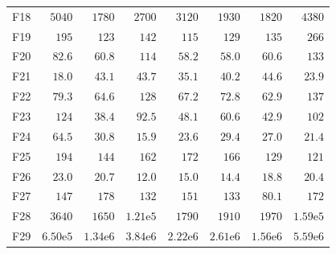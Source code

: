 \begin{tabular}{lrrrrrrr}
F18 & $5040$ & $1780$ & $2700$ & $3120$ & $1930$ & $1820$ & $4380$ \\
F19 & $195$ & $123$ & $142$ & $115$ & $129$ & $135$ & $266$ \\
F20 & $82.6$ & $60.8$ & $114$ & $58.2$ & $58.0$ & $60.6$ & $133$ \\
F21 & $18.0$ & $43.1$ & $43.7$ & $35.1$ & $40.2$ & $44.6$ & $23.9$ \\
F22 & $79.3$ & $64.6$ & $128$ & $67.2$ & $72.8$ & $62.9$ & $137$ \\
F23 & $124$ & $38.4$ & $92.5$ & $48.1$ & $60.6$ & $42.9$ & $102$ \\
F24 & $64.5$ & $30.8$ & $15.9$ & $23.6$ & $29.4$ & $27.0$ & $21.4$ \\
F25 & $194$ & $144$ & $162$ & $172$ & $166$ & $129$ & $121$ \\
F26 & $23.0$ & $20.7$ & $12.0$ & $15.0$ & $14.4$ & $18.8$ & $20.4$ \\
F27 & $147$ & $178$ & $132$ & $151$ & $133$ & $80.1$ & $172$ \\
F28 & $3640$ & $1650$ & $1.21\mathrm{e}{5}$ & $1790$ & $1910$ & $1970$ & $1.59\mathrm{e}{5}$ \\
F29 & $6.50\mathrm{e}{5}$ & $1.34\mathrm{e}{6}$ & $3.84\mathrm{e}{6}$ & $2.22\mathrm{e}{6}$ & $2.61\mathrm{e}{6}$ & $1.56\mathrm{e}{6}$ & $5.59\mathrm{e}{6}$ \\
\bottomrule
\end{tabular}
